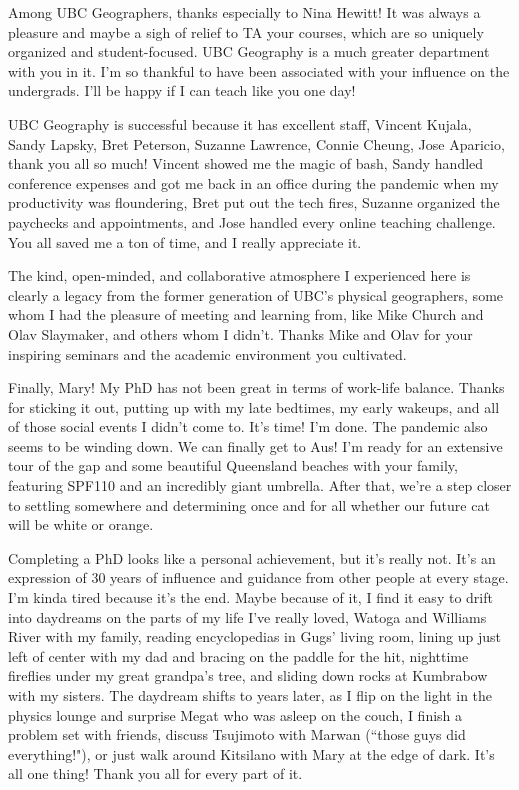 Among UBC Geographers, thanks especially to Nina Hewitt! It was always a pleasure and maybe a sigh of relief to TA your courses, which are so uniquely organized and student-focused. UBC Geography is a much greater department with you in it. I'm so thankful to have been associated with your influence on the undergrads. I'll be happy if I can teach like you one day!

UBC Geography is successful because it has excellent staff, Vincent Kujala, Sandy Lapsky, Bret Peterson, Suzanne Lawrence, Connie Cheung, Jose Aparicio, thank you all so much! 
Vincent showed me the magic of bash, Sandy handled conference expenses and got me back in an office during the pandemic when my productivity was floundering, Bret put out the tech fires, Suzanne organized the paychecks and appointments, and Jose handled every online teaching challenge. You all saved me a ton of time, and I really appreciate it. 

The kind, open-minded, and collaborative atmosphere I experienced here is clearly a legacy from the former generation of UBC's physical geographers, some whom I had the pleasure of meeting and learning from, like Mike Church and Olav Slaymaker, and others whom I didn't. Thanks Mike and Olav for your inspiring seminars and the academic environment you cultivated.

Finally, Mary! My PhD has not been great in terms of work-life balance. Thanks for sticking it out, putting up with my late bedtimes, my early wakeups, and all of those social events I didn't come to. It's time! I'm done. The pandemic also seems to be winding down. We can finally get to Aus! I'm ready for an extensive tour of the gap and some beautiful Queensland beaches with your family, featuring SPF110 and an incredibly giant umbrella. After that, we're a step closer to settling somewhere and determining once and for all whether our future cat will be white or orange.

Completing a PhD looks like a personal achievement, but it's really not.
It's an expression of 30 years of influence and guidance from other people at every stage.
I'm kinda tired because it's the end. Maybe because of it, I find it easy to drift into daydreams on the parts of my life I've really loved, Watoga and Williams River with my family, reading encyclopedias in Gugs' living room, lining up just left of center with my dad and bracing on the paddle for the hit, nighttime fireflies under my great grandpa's tree, and sliding down rocks at Kumbrabow with my sisters. The daydream shifts to years later, as I flip on the light in the physics lounge and surprise Megat who was asleep on the couch, I finish a problem set with friends, discuss Tsujimoto with Marwan (``those guys did everything!"), or just walk around Kitsilano with Mary at the edge of dark. It's all one thing! Thank you all for every part of it.




